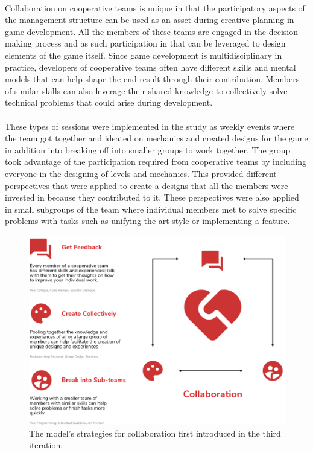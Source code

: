 \paragraph{} Collaboration on cooperative teams is unique in that the participatory aspects of the management structure can be used as an asset during creative planning in game development. All the members of these teams are engaged in the decision-making process and as such participation in that can be leveraged to design elements of the game itself. Since game development is multidisciplinary in practice, developers of cooperative teams often have different skills and mental models that can help shape the end result through their contribution. Members of similar skills can also leverage their shared knowledge to collectively solve technical problems that could arise during development.

\paragraph{} These types of sessions were implemented in the study as weekly events where the team got together and ideated on mechanics and created designs for the game in addition into breaking off into smaller groups to work together. The group took advantage of the participation required from cooperative teams by including everyone in the designing of levels and mechanics. This provided different perspectives that were applied to create a designs that all the members were invested in because they contributed to it. These perspectives were also applied in small subgroups of the team where individual members met to solve specific problems with tasks such as unifying the art style or implementing a feature.

\begin{figure}[h!]
    \centering
    \includegraphics[width=\linewidth]{Figures/Collab.png}
    \caption{The model's strategies for collaboration first introduced in the third iteration.}
\end{figure}

